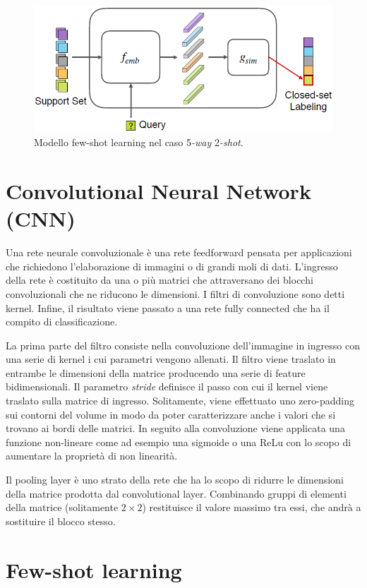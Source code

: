 \documentclass[12pt,a4paper,titlepage]{article}
\begin{document}
\begin{figure}[h]
	\centering	
	\includegraphics[width=.5\textwidth]{Immagini/few_shot_learning_model}
	\caption{Modello few-shot learning nel caso 5\emph{-way} 2\emph{-shot}.~\cite{Salamon:Few-Shot}}
	\label{fig:few-shot_learning_model}
\end{figure}
\clearpage

\section{Convolutional Neural Network (CNN)}
Una rete neurale convoluzionale è una rete feedforward pensata per applicazioni che richiedono l'elaborazione di immagini o di grandi moli di dati.
L'ingresso della rete è costituito da una o più matrici che attraversano dei blocchi convoluzionali che ne riducono le dimensioni. I filtri di convoluzione sono detti kernel. Infine, il risultato viene passato a una rete fully connected che ha il compito di classificazione.

La prima parte del filtro consiste nella convoluzione dell'immagine in ingresso con una serie di kernel i cui parametri vengono allenati.
Il filtro viene traslato in entrambe le dimensioni della matrice producendo una serie di feature bidimensionali.
Il parametro \textit{stride} definisce il passo con cui il kernel viene traslato sulla matrice di ingresso.
Solitamente, viene effettuato uno zero-padding sui contorni del volume in modo da poter caratterizzare anche i valori che si trovano ai bordi delle matrici.
In seguito alla convoluzione viene applicata una funzione non-lineare come ad esempio una sigmoide o una ReLu con lo scopo di aumentare la proprietà di non linearità.

Il pooling layer è uno strato della rete che ha lo scopo di ridurre le dimensioni della matrice prodotta dal convolutional layer. Combinando gruppi di elementi della matrice (solitamente $2 \times 2$) restituisce il valore massimo tra essi, che andrà a sostituire il blocco stesso.

\section{Few-shot learning}
\label{section:Few-shot}
\end{document}
